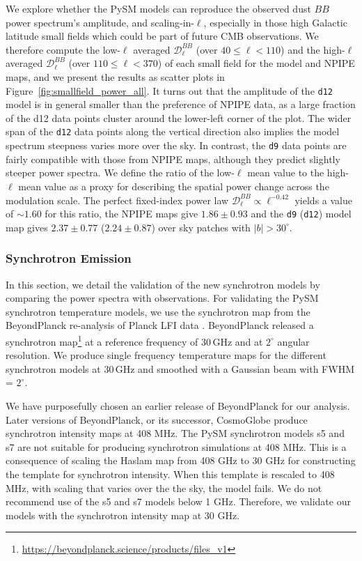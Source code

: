 \documentclass[twocolumn]{aastex631}
\begin{document}
We explore whether the PySM models can reproduce the observed dust $BB$ power spectrum's amplitude, and scaling-in-$\ell$, especially in those high Galactic latitude small fields which could be part of future CMB observations. We therefore compute the low-$\ell$ averaged $\mathcal{D}_\ell^{BB}$ (over $40 \le \ell < 110$) and the high-$\ell$ averaged $\mathcal{D}_\ell^{BB}$ (over $110 \le \ell < 370$) of each small field for the model and NPIPE maps, and we present the results as scatter plots in Figure~\ref{fig:smallfield_power_all}. It turns out that the amplitude of the \texttt{d12} model is in general smaller than the preference of NPIPE data, as a large fraction of the d12 data points cluster around the lower-left corner of the plot. The wider span of the \texttt{d12} data points along the vertical direction also implies the model spectrum steepness varies more over the sky. In contrast, the \texttt{d9} data points are fairly compatible with those from NPIPE maps, although they predict slightly steeper power spectra. We define the ratio of the low-$\ell$ mean value to the high-$\ell$ mean value as a proxy for describing the spatial power change across the modulation scale. The perfect fixed-index power law $\mathcal{D}_\ell^{BB} \propto \ell^{-0.42}$ yields a value of $\sim 1.60$ for this ratio, the NPIPE maps give $1.86 \pm 0.93$ and the \texttt{d9} (\texttt{d12}) model map gives $2.37 \pm 0.77$ ($2.24 \pm 0.87$) over sky patches with $|b| > 30^\circ$.

\subsubsection{Synchrotron Emission} \label{sec:sync_validation}

In this section, we detail the validation of the new synchrotron models by comparing the power spectra with observations. For validating the PySM synchrotron temperature models, we use the synchrotron map from the BeyondPlanck re-analysis of Planck LFI data \citep{Andersen:2023}. BeyondPlanck released a synchrotron map\footnote{\url{https://beyondplanck.science/products/files\_v1}} at a reference frequency of 30\,GHz and at $2^\circ$ angular resolution. We produce single frequency temperature maps for the different synchrotron models at 30\,GHz and smoothed with a Gaussian beam with FWHM = $2^\circ$.

We have purposefully chosen an earlier release of BeyondPlanck for our analysis. Later versions of BeyondPlanck, or its successor, CosmoGlobe produce synchrotron intensity maps at 408 MHz. The PySM synchrotron models s5 and s7 are not suitable for producing synchrotron simulations at 408 MHz. This is a consequence of scaling the Haslam map from 408 GHz to 30 GHz for constructing the template for synchrotron intensity. When this template is rescaled to 408 MHz, with scaling that varies over the the sky, the model fails. We do not recommend use of the s5 and s7 models below 1 GHz. Therefore, we validate our models with the synchrotron intensity map at 30 GHz.
\end{document}
